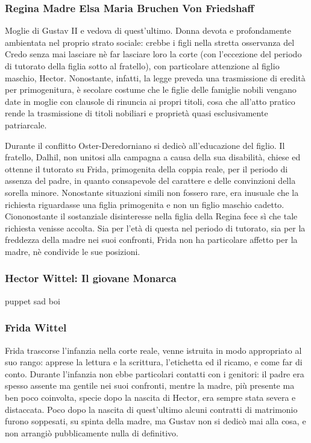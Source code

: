 \subsubsection{Regina Madre Elsa Maria Bruchen Von Friedshaff}
Moglie di Gustav II e vedova di quest'ultimo. Donna devota e profondamente ambientata nel proprio strato sociale: crebbe i figli nella stretta osservanza del Credo senza mai lasciare nè far lasciare loro la corte (con l'eccezione del periodo di tutorato della figlia sotto al fratello), con particolare attenzione al figlio maschio, Hector. Nonostante, infatti, la legge preveda una trasmissione di eredità per primogenitura, è secolare costume che le figlie delle famiglie nobili vengano date in moglie con clausole di rinuncia ai propri titoli, cosa che all'atto pratico rende la trasmissione di titoli nobiliari e proprietà quasi esclusivamente patriarcale.

Durante il conflitto Oster-Deredorniano si dedicò all'educazione del figlio. Il fratello, Dalhil, non unitosi alla campagna a causa della sua disabilità, chiese ed ottenne il tutorato su Frida, primogenita della coppia reale, per il periodo di assenza del padre, in quanto consapevole del carattere e delle convinzioni della sorella minore. Nonostante situazioni simili non fossero rare, era inusuale che la richiesta riguardasse una figlia primogenita e non un figlio maschio cadetto. Ciononostante il sostanziale disinteresse nella figlia della Regina fece sì che tale richiesta venisse accolta. Sia per l'età di questa nel periodo di tutorato, sia per la freddezza della madre nei suoi confronti, Frida non ha particolare affetto per la madre, nè condivide le sue posizioni.

\subsubsection{Hector Wittel: Il giovane Monarca}
puppet sad boi

\subsubsection{Frida Wittel}
Frida trascorse l'infanzia nella corte reale, venne istruita in modo appropriato al suo rango: apprese la lettura e la scrittura, l'etichetta ed il ricamo, e come far di conto. Durante l'infanzia non ebbe particolari contatti con i genitori: il padre era spesso assente ma gentile nei suoi confronti, mentre la madre, più presente ma ben poco coinvolta, specie dopo la nascita di Hector, era sempre stata severa e distaccata. Poco dopo la nascita di quest'ultimo alcuni contratti di matrimonio furono soppesati, su spinta della madre, ma Gustav non si dedicò mai alla cosa, e non arrangiò pubblicamente nulla di definitivo.

